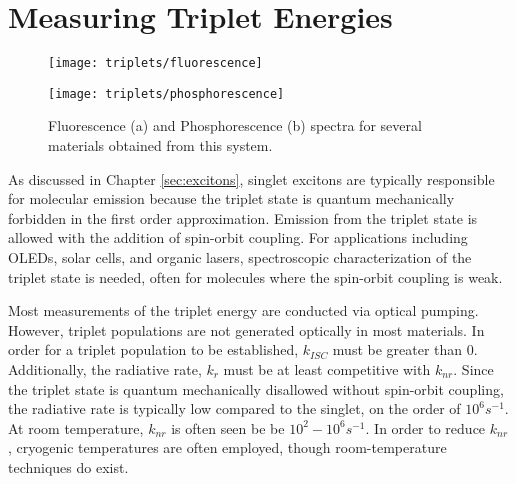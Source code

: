 \documentclass[../thesis.tex]{subfiles}
\begin{document}
\chapter{Measuring Triplet Energies}\label{sec:triplets}

\begin{wrapfigure}{r}{.5\textwidth}
    \begin{minipage}{\linewidth}
    \centering%
    \texttt{[image: triplets/fluorescence]}

    \texttt{[image: triplets/phosphorescence]}
\end{minipage}
\caption{Fluorescence (a) and Phosphorescence (b) spectra for several materials obtained from this system.}
\label{fig:triplets}
\end{wrapfigure}

As discussed in Chapter \ref{sec:excitons}, singlet excitons are typically responsible for molecular emission because the triplet state is quantum mechanically forbidden in the first order approximation.\supercite{Turro1991a}
Emission from the triplet state is allowed with the addition of spin-orbit coupling.\supercite{Baldo1998a}
For applications including OLEDs, solar cells, and organic lasers, spectroscopic characterization of the triplet state is needed, often for molecules where the spin-orbit coupling is weak.\supercite{Tokito2003a,Goushi2004d,Zhang2011a,Schueppel2007}

Most measurements of the triplet energy are conducted via optical pumping.\supercite{Turro1991a,Goushi2004d,Padhye1956,Holmes2003}
However, triplet populations are not generated optically in most materials.\supercite{Turro1991a}
In order for a triplet population to be established, $k_{ISC}$ must be greater than 0.
Additionally, the radiative rate, $k_r$ must be at least competitive with $k_{nr}$.
Since the triplet state is quantum mechanically disallowed without spin-orbit coupling, the radiative rate is typically low compared to the singlet, on the order of $10^6 s^{-1}$.
At room temperature, $k_{nr}$ is often seen be be $10^2-10^6 s^{-1}$.\supercite{Reineke2014}
In order to reduce $k_{nr}$, cryogenic temperatures are often employed, though room-temperature techniques do exist.\supercite{Reineke2014}
\end{document}
